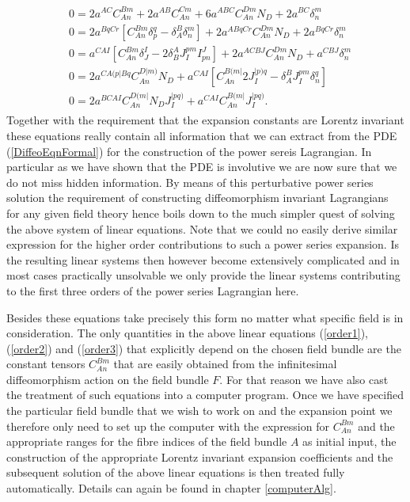 \documentclass[a4paper,12pt, DIV=14, BCOR=5mm, twoside, headsepline]{scrbook}
\begin{document}
\begin{align}\label{order3}
\begin{aligned}
&0 = 2 a^{AC}C_{An}^{Bm} + 2a^{AB}C_{An}^{Cm} + 6 a^{ABC}C_{An}^{Dm} N_D + 2a^{BC} \delta^m_n\\
&0 = 2 a^{BqCr} \left [ C_{An}^{Bm} \delta ^q_p - \delta^B_A \delta^m_n \right ] +2 a^{A Bq Cr} C_{An}^{Dm} N_D + 2 a^{BqCr} \delta^m_n\\
&0 = a^{CAI} \left [C_{An}^{Bm}\delta^I _J- 2 \delta^A_B J_I^{pm}I^J_{pn} \right ] + 2 a^{ACBJ} C_{An}^{Dm} N_D + a^{CBJ} \delta ^m _n \\
&0 = 2 a^{C A(p \vert B q} C_{An}^{D \vert m )} N_D + a^{CAI} \left [C_{An}^{B(m\vert} 2 J_{I}^{\vert p)q} - \delta_A^BJ_I^{pm}\delta^q_n \right ]\\
&0 = 2 a^{BCAI}C_{An}^{D(m\vert}N_DJ_I^{\vert pq)} + a^{CAI}C_{An}^{B(m \vert} J_I^{\vert pq)}.
\end{aligned}
\end{align}
Together with the requirement that the expansion constants are Lorentz invariant these equations really contain all information that we can extract from the PDE (\ref{DiffeoEqnFormal}) for the construction of the power sereis Lagrangian. In particular as we have shown that the PDE is involutive we are now sure that we do not miss hidden information.  By means of this perturbative power series solution the requirement of constructing diffeomorphism invariant Lagrangians for any given field theory hence boils down to the much simpler quest of solving the above system of linear equations.
Note that we could no easily derive similar expression for the higher order contributions to such a power series expansion. Is the resulting linear systems then however become extensively complicated and in most cases practically unsolvable we only provide the linear systems contributing to the first three orders of the power series Lagrangian here. 

Besides these equations take precisely this form no matter what specific field is in consideration. The only quantities in the above linear equations (\ref{order1}), (\ref{order2}) and (\ref{order3}) that explicitly depend on the chosen field bundle are the constant tensors $C_{An}^{Bm}$ that are easily obtained from the infinitesimal diffeomorphism action on the field bundle $F$.  For that reason we have also cast the treatment of such equations into a computer program. Once we have specified the particular field bundle that we wish to work on and the expansion point we therefore only need to set up the computer with the expression for $C_{An}^{Bm}$ and the appropriate ranges for the fibre indices of the field bundle $A$ as initial input, the construction of the appropriate Lorentz invariant expansion coefficients and the subsequent solution of the above linear equations is then treated fully automatically. Details can again be found in chapter \ref{computerAlg}. \\
\end{document}
